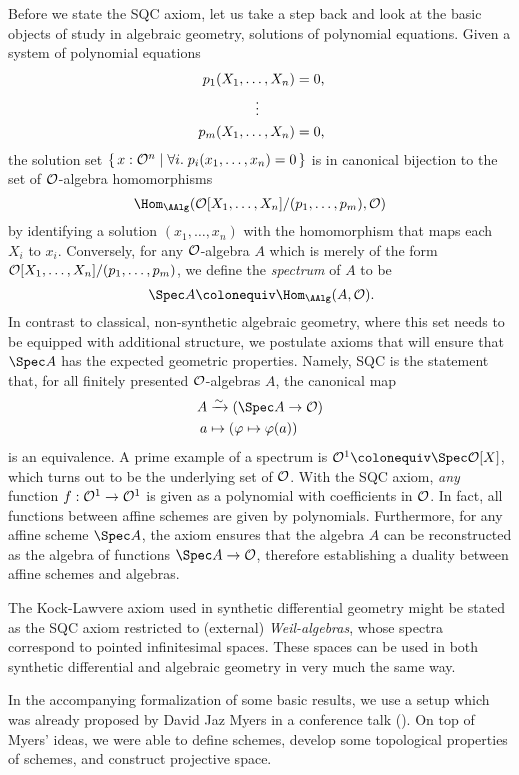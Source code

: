 Before we state the SQC axiom, let us take a step back and look at the basic objects of study in algebraic geometry,
solutions of polynomial equations.
Given a system of polynomial equations
\begin{align*}
  p_1(X_1, \dots, X_n) &= 0\rlap{,} \\
  \vdots\quad\quad\;\;   \\
  p_m(X_1, \dots, X_n) &= 0\rlap{,}
\end{align*}
the solution set
$\{\, x : \mathcal O^n \mid \forall i.\; p_i(x_1, \dots, x_n) = 0 \,\}$
is in canonical bijection to the set of $\mathcal O$-algebra homomorphisms
\[ \Hom_{\AAlg}(\A[X_1, \dots, X_n]/(p_1, \dots, p_m), \A) \]
by identifying a solution $(x_1,\dots,x_n)$ with the homomorphism that maps each $X_i$ to $x_i$.
Conversely, for any $\mathcal O$-algebra $A$ which is merely of the form $\mathcal O[X_1, \dots, X_n]/(p_1, \dots, p_m)$,
we define the \emph{spectrum} of $A$ to be
\[
  \Spec A \colonequiv \Hom_{\AAlg}(A, \A)
  \rlap{.}
\]
In contrast to classical, non-synthetic algebraic geometry,
where this set needs to be equipped with additional structure,
we postulate axioms that will ensure that $\Spec A$ has the expected geometric properties.
Namely, SQC is the statement that, for all finitely presented $\mathcal O$-algebras $A$, the canonical map
  \begin{align*}
    A&\xrightarrow{\sim} (\Spec A\to \A) \\
    a&\mapsto (\varphi\mapsto \varphi(a))
  \end{align*}
is an equivalence.
A prime example of a spectrum is $\A^1\colonequiv \Spec \A[X]$,
which turns out to be the underlying set of $\mathcal O$.
With the SQC axiom,
\emph{any} function $f:\mathcal O^1\to \mathcal O^1$ is given as a polynomial with coefficients in $\mathcal O$.
In fact, all functions between affine schemes are given by polynomials.
Furthermore, for any affine scheme $\Spec A$,
the axiom ensures that
the algebra $A$ can be reconstructed as the algebra of functions $\Spec A \to \A$,
therefore establishing a duality between affine schemes and algebras.

The Kock-Lawvere axiom used in synthetic differential geometry
might be stated as the SQC axiom restricted to (external) \emph{Weil-algebras},
whose spectra correspond to pointed infinitesimal spaces.
These spaces can be used in both synthetic differential and algebraic geometry
in very much the same way.

In the accompanying formalization \cite{formalization} of some basic results,
we use a setup which was already proposed by David Jaz Myers
in a conference talk (\cite{myers-talk1, myers-talk2}).
On top of Myers' ideas,
we were able to define schemes, develop some topological properties of schemes,
and construct projective space.

